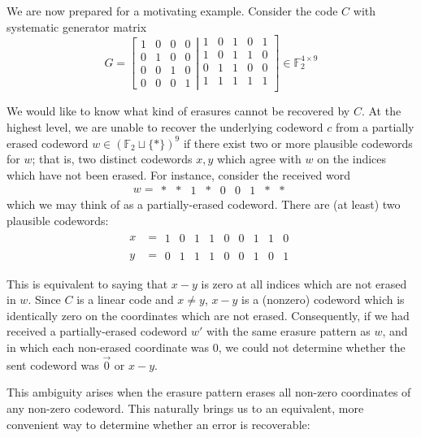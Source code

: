 \documentclass[12pt]{article}
\newcommand{\F}{\mathbb{F}}
\def\F{\mathbb F}
\newcommand{\FF}{\mathbb{F}}
\theoremstyle{definition}
\begin{document}
We are now prepared for a motivating example. Consider the code \(C\) with systematic generator matrix
\[
G = \left[ \begin{array}{rrrr} 1 & 0 & 0 & 0 \\ 0 & 1 & 0 & 0 \\ 0 & 0 & 1 & 0 \\ 0 & 0 & 0 & 1 \end{array} \right| \left.
\begin{array}{rrrrr}
1 & 0 & 1 & 0 & 1 \\
1 & 0 & 1 & 1 & 0 \\
0 & 1 & 1 & 0 & 0 \\ 
1 & 1 & 1 & 1 & 1 \\
\end{array}
\right] \in \F_2^{4 \times 9}
\]

We would like to know what kind of erasures cannot be recovered by \(C\). At the highest level, we are unable to recover the underlying codeword \(c\) from a partially erased codeword \(w \in \left(\FF_2 \sqcup \{*\}\right)^9\) if there exist two or more plausible codewords for \(w\); that is, two distinct codewords \(x, y\) which agree with \(w\) on the indices which have not been erased. For instance, consider the received word 
\[
w = \begin{array}{ccccccccc} *& *& 1& *& 0& 0& 1& *& * \end{array}
\]
which we may think of as a partially-erased codeword. There are (at least) two plausible codewords:
\begin{align*}
x &= \begin{array}{ccccccccc} 1& 0& 1& 1& 0& 0& 1& 1& 0\end{array}\\
y &= \begin{array}{ccccccccc} 0& 1& 1& 1& 0& 0& 1& 0& 1\end{array}
\end{align*}

This is equivalent to saying that \(x-y\) is zero at all indices which are not erased in \(w\). Since \(C\) is a linear code and $x \neq y$, \(x-y\) is a (nonzero) codeword which is identically zero on the coordinates which are not erased. Consequently, if we had received a partially-erased codeword \(w'\) with the same erasure pattern as \(w\), and in which each non-erased coordinate was \(0\), we could not determine whether the sent codeword was \(\vec{0}\) or \(x-y\). 

This ambiguity arises when the erasure pattern erases all non-zero coordinates of any non-zero codeword. This naturally brings us to an equivalent, more convenient way to determine whether an error is recoverable: 
\end{document}
